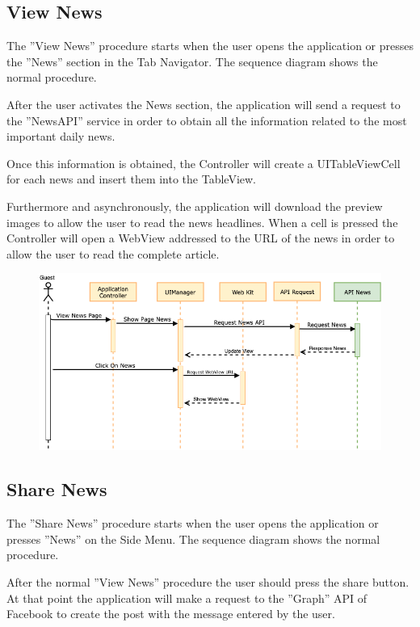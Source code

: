 \documentclass[numbers=noenddot, 12pt, a4paper, oneside]{scrbook}
\begin{document}
\subsection*{View News}
The ”View News” procedure starts when the user opens the application or presses the ”News” section in the Tab Navigator. The sequence diagram shows the normal procedure.

After the user activates the News section, the application will send a request to the ”NewsAPI” service in order to obtain all the information related to the most important daily news.

Once this information is obtained, the Controller will create a UITableViewCell for each news and insert them into the TableView.

Furthermore and asynchronously, the application will download the preview images to allow the user to read the news headlines. When a cell is pressed the Controller will open a WebView addressed to the URL of the news in order to allow the user to read  the complete article.

\begin{figure}[H]
	\centering
	\includegraphics[width=1\textwidth]{images/Sequence/SequenceNews}
\end{figure}


\newpage

\subsection*{Share News}
The ”Share News” procedure starts when the user opens the application or presses ”News” on the Side Menu. The sequence diagram shows the normal procedure.

After the normal ”View News” procedure the user should press the share button. At that point the application will make a request to the ”Graph” API of Facebook to create the post with the message entered by the user.
\end{document}
